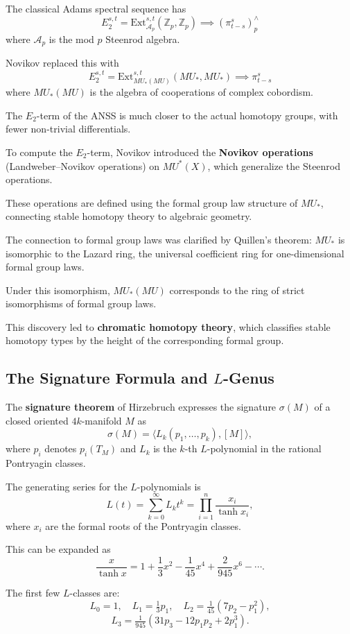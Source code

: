 The classical Adams spectral sequence has
\[
E_2^{s,t} = \text{Ext}_{\mathcal{A}_p}^{s,t}(\mathbb{Z}_p, \mathbb{Z}_p) \implies (\pi_{t-s}^s)_p^\wedge
\]
where $\mathcal{A}_p$ is the mod $p$ Steenrod algebra.

Novikov replaced this with
\[
E_2^{s,t} = \text{Ext}_{MU_*(MU)}^{s,t}(MU_*, MU_*) \implies \pi_{t-s}^s
\]
where $MU_*(MU)$ is the algebra of cooperations of complex cobordism.

The $E_2$-term of the ANSS is much closer to the actual homotopy groups, with fewer non-trivial differentials.

To compute the $E_2$-term, Novikov introduced the \textbf{Novikov operations} (Landweber--Novikov operations) on $MU^*(X)$, which generalize the Steenrod operations.

These operations are defined using the formal group law structure of $MU_*$, connecting stable homotopy theory to algebraic geometry.

The connection to formal group laws was clarified by Quillen's theorem: $MU_*$ is isomorphic to the Lazard ring, the universal coefficient ring for one-dimensional formal group laws.

Under this isomorphism, $MU_*(MU)$ corresponds to the ring of strict isomorphisms of formal group laws.

This discovery led to \textbf{chromatic homotopy theory}, which classifies stable homotopy types by the height of the corresponding formal group.

\subsection*{The Signature Formula and $L$-Genus}

The \textbf{signature theorem} of Hirzebruch expresses the signature $\sigma(M)$ of a closed oriented $4k$-manifold $M$ as
\[
\sigma(M) = \langle L_k(p_1, \ldots, p_k), [M] \rangle,
\]
where $p_i$ denotes $p_i(T_M)$ and $L_k$ is the $k$-th $L$-polynomial in the rational Pontryagin classes.

The generating series for the $L$-polynomials is
\[
L(t) = \sum_{k=0}^{\infty} L_k t^k = \prod_{i=1}^{n} \frac{x_i}{\tanh x_i},
\]
where $x_i$ are the formal roots of the Pontryagin classes.

This can be expanded as
\[
\frac{x}{\tanh x} = 1 + \frac{1}{3}x^2 - \frac{1}{45}x^4 + \frac{2}{945}x^6 - \cdots.
\]

The first few $L$-classes are:
\[
L_0 = 1, \quad L_1 = \tfrac{1}{3}p_1, \quad L_2 = \tfrac{1}{45}(7p_2 - p_1^2),
\]
\[
L_3 = \tfrac{1}{945}(31p_3 - 12p_1 p_2 + 2p_1^3).
\]

